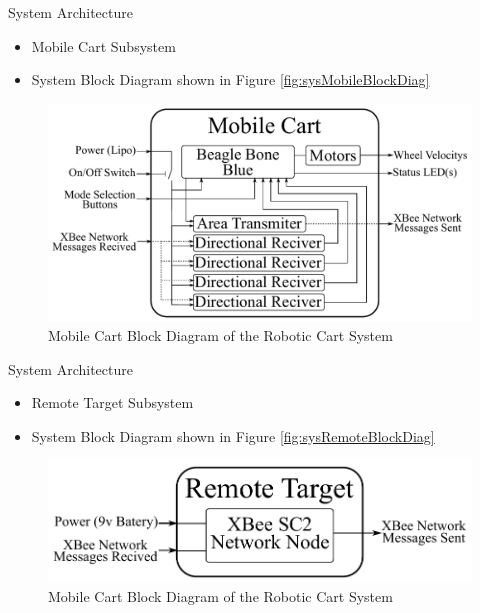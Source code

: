 \documentclass{beamer}
\begin{document}
\begin{frame}{System Architecture}
    \begin{itemize}
        \item Mobile Cart Subsystem
        \item System Block Diagram shown in Figure \autoref{fig:sysMobileBlockDiag}
    \end{itemize}
    \begin{figure}[b]
        \centering
        \includegraphics[width=\textwidth]{figs/mobile_cart_block_diagram}
        \caption{Mobile Cart Block Diagram of the Robotic Cart System}
        \label{fig:sysMobileBlockDiag}
    \end{figure}
\end{frame}


\begin{frame}{System Architecture}
    \begin{itemize}
        \item Remote Target Subsystem
        \item System Block Diagram shown in Figure \autoref{fig:sysRemoteBlockDiag}
    \end{itemize}
    \begin{figure}[b]
        \centering
        \includegraphics[width=\textwidth]{figs/remote_target_block_diagram}
        \caption{Mobile Cart Block Diagram of the Robotic Cart System}
        \label{fig:sysRemoteBlockDiag}
    \end{figure}
\end{frame}
\end{document}
